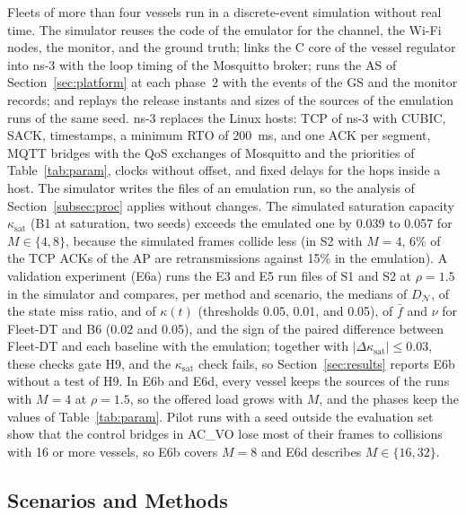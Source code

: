 Fleets of more than four vessels run in a discrete-event simulation without real time. The simulator reuses the code of the emulator for the channel, the Wi-Fi nodes, the monitor, and the ground truth; links the C core of the vessel regulator into ns-3 with the loop timing of the Mosquitto broker; runs the AS of Section~\ref{sec:platform} at each phase~2 with the events of the GS and the monitor records; and replays the release instants and sizes of the sources of the emulation runs of the same seed. ns-3 replaces the Linux hosts: TCP of ns-3 with CUBIC, SACK, timestamps, a minimum RTO of 200~ms, and one ACK per segment, MQTT bridges with the QoS exchanges of Mosquitto and the priorities of Table~\ref{tab:param}, clocks without offset, and fixed delays for the hops inside a host. The simulator writes the files of an emulation run, so the analysis of Section~\ref{subsec:proc} applies without changes. The simulated saturation capacity $\kappa_{\mathrm{sat}}$ (B1 at saturation, two seeds) exceeds the emulated one by 0.039 to 0.057 for $M \in \{4, 8\}$, because the simulated frames collide less (in S2 with $M = 4$, 6\% of the TCP ACKs of the AP are retransmissions against 15\% in the emulation). A validation experiment (E6a) runs the E3 and E5 run files of S1 and S2 at $\rho = 1.5$ in the simulator and compares, per method and scenario, the medians of $D_{\mathcal{N}}$, of the state miss ratio, and of $\kappa(t)$ (thresholds 0.05, 0.01, and 0.05), of $\bar{f}$ and $\nu$ for Fleet-DT and B6 (0.02 and 0.05), and the sign of the paired difference between Fleet-DT and each baseline with the emulation; together with $|\Delta\kappa_{\mathrm{sat}}| \leq 0.03$, these checks gate H9, and the $\kappa_{\mathrm{sat}}$ check fails, so Section~\ref{sec:results} reports E6b without a test of H9. In E6b and E6d, every vessel keeps the sources of the runs with $M = 4$ at $\rho = 1.5$, so the offered load grows with $M$, and the phases keep the values of Table~\ref{tab:param}. Pilot runs with a seed outside the evaluation set show that the control bridges in AC\_VO lose most of their frames to collisions with 16 or more vessels, so E6b covers $M = 8$ and E6d describes $M \in \{16, 32\}$.

\subsection{Scenarios and Methods}\label{subsec:scen}

